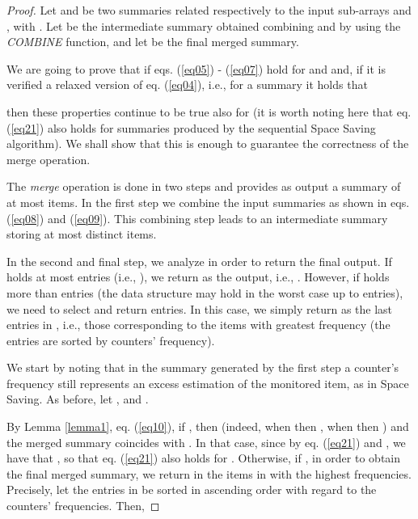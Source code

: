 \documentclass[final,3p,times]{elsarticle}
\newcommand\noi{\noindent}
\begin{document}
\begin{proof}
Let  and  be two summaries related respectively to the input sub-arrays  and , with . Let  be the intermediate summary obtained combining  and  by using the \textit{COMBINE} function, and let  be the final merged summary. 


We are going to prove that if eqs. (\ref{eq05}) - (\ref{eq07}) hold for  and  and, if it is verified a relaxed version of eq. (\ref{eq04}), i.e., for a summary  it holds that



\noi then these properties  continue to be true also for  (it is worth noting here that eq. (\ref{eq21}) also holds for summaries produced by the sequential Space Saving algorithm). We shall show that this is enough to guarantee the correctness of the merge operation. 
 
The \textit{merge} operation is done in two steps and provides as output a summary of at most  items. In the first step we combine the input summaries as shown in eqs. (\ref{eq08}) and (\ref{eq09}). This combining step leads to an intermediate summary  storing at most  distinct items.

In the second and final step, we analyze  in order to return the final output. If  holds at most  entries (i.e., ), we return  as the output, i.e., . However, if  holds more than  entries (the data structure may hold in the worst case up to  entries), we need to select and return  entries. In this case, we simply return as  the last  entries in , i.e., those corresponding to the items with greatest frequency (the entries are sorted by counters' frequency). 

We start by noting that in the summary  generated by the first step a counter's frequency still represents an excess estimation of the monitored item, as in Space Saving. As before, let , and . 








By Lemma \ref{lemma1}, eq. (\ref{eq10}), if , then  (indeed, when   then , when  then ) and the merged summary  coincides with . In that case, since by eq. (\ref{eq21})  and , we have that , so that eq. (\ref{eq21}) also holds for . Otherwise, if , in order to obtain the final merged summary, we return in  the  items in  with the highest frequencies. Precisely, let the entries in  be sorted in ascending order with regard to the counters' frequencies. Then,





\end{proof}
\end{document}
